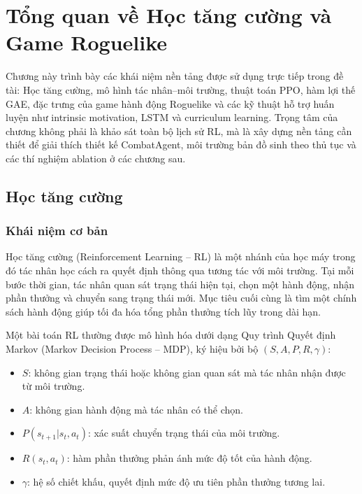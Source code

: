 \clearpage
{}

\setcounter{chapter}{0}
\chapter[{Tổng quan về Học tăng cường và Game Roguelike}]{Tổng quan về Học tăng cường và Game Roguelike}

Chương này trình bày các khái niệm nền tảng được sử dụng trực tiếp trong đề tài: Học tăng cường, mô hình tác nhân--môi trường, thuật toán PPO, hàm lợi thế GAE, đặc trưng của game hành động Roguelike và các kỹ thuật hỗ trợ huấn luyện như intrinsic motivation, LSTM và curriculum learning. Trọng tâm của chương không phải là khảo sát toàn bộ lịch sử RL, mà là xây dựng nền tảng cần thiết để giải thích thiết kế CombatAgent, môi trường bản đồ sinh theo thủ tục và các thí nghiệm ablation ở các chương sau.

\section{Học tăng cường}
\subsection{Khái niệm cơ bản}

Học tăng cường (Reinforcement Learning -- RL) là một nhánh của học máy trong đó tác nhân học cách ra quyết định thông qua tương tác với môi trường. Tại mỗi bước thời gian, tác nhân quan sát trạng thái hiện tại, chọn một hành động, nhận phần thưởng và chuyển sang trạng thái mới. Mục tiêu cuối cùng là tìm một chính sách hành động giúp tối đa hóa tổng phần thưởng tích lũy trong dài hạn.

Một bài toán RL thường được mô hình hóa dưới dạng Quy trình Quyết định Markov (Markov Decision Process -- MDP), ký hiệu bởi bộ $(S,A,P,R,\gamma)$:

\begin{itemize}
    \item $S$: không gian trạng thái hoặc không gian quan sát mà tác nhân nhận được từ môi trường.
    \item $A$: không gian hành động mà tác nhân có thể chọn.
    \item $P(s_{t+1}|s_t,a_t)$: xác suất chuyển trạng thái của môi trường.
    \item $R(s_t,a_t)$: hàm phần thưởng phản ánh mức độ tốt của hành động.
    \item $\gamma$: hệ số chiết khấu, quyết định mức độ ưu tiên phần thưởng tương lai.
\end{itemize}

